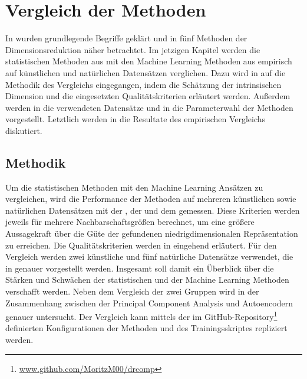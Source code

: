 \chapter{Vergleich der Methoden}
\label{ch:Vergleich}

In  wurden grundlegende Begriffe geklärt und in
 fünf Methoden der Dimensionsreduktion näher betrachtet. Im jetzigen
Kapitel werden die statistischen Methoden aus  mit den
Machine Learning Methoden aus  empirisch auf künstlichen und
natürlichen Datensätzen verglichen. Dazu wird in  auf die
Methodik des Vergleichs eingegangen, indem die Schätzung der intrinsischen Dimension und die
eingesetzten Qualitätskriterien erläutert werden. Außerdem werden in
 die verwendeten Datensätze und in
 die Parameterwahl der Methoden vorgestellt.
Letztlich werden in  die Resultate des empirischen Vergleichs
diskutiert.

\section{Methodik}
\label{ch:Vergleich:sec:Methodik}

Um die statistischen Methoden mit den Machine Learning Ansätzen zu vergleichen, wird die
Performance der Methoden auf mehreren künstlichen sowie natürlichen Datensätzen mit der
, der  und dem  gemessen. Diese Kriterien werden jeweils für mehrere Nachbarschaftsgrößen
berechnet, um eine größere Aussagekraft über die Güte der gefundenen niedrigdimensionalen
Repräsentation zu erreichen. Die Qualitätskriterien werden in
 eingehend erläutert. Für den
Vergleich werden zwei künstliche und fünf natürliche Datensätze verwendet, die in
 genauer vorgestellt werden. Insgesamt soll damit
ein Überblick über die Stärken und Schwächen der statistischen und der Machine Learning Methoden
verschafft werden. Neben dem Vergleich der zwei Gruppen wird in
 der Zusammenhang zwischen der Principal Component
Analysis und Autoencodern genauer untersucht. Der Vergleich kann mittels der im
GitHub-Repository\footnote{\url{www.github.com/MoritzM00/drcomp}} definierten Konfigurationen der
Methoden und des Trainingsskriptes repliziert werden. 

